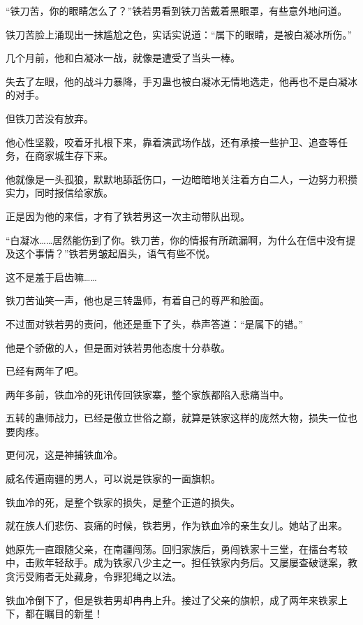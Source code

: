 
\begin{this_body}



“铁刀苦，你的眼睛怎么了？”铁若男看到铁刀苦戴着黑眼罩，有些意外地问道。

铁刀苦脸上涌现出一抹尴尬之色，实话实说道：“属下的眼睛，是被白凝冰所伤。”

几个月前，他和白凝冰一战，就像是遭受了当头一棒。

失去了左眼，他的战斗力暴降，手刃蛊也被白凝冰无情地选走，他再也不是白凝冰的对手。

但铁刀苦没有放弃。

他心性坚毅，咬着牙扎根下来，靠着演武场作战，还有承接一些护卫、追查等任务，在商家城生存下来。

他就像是一头孤狼，默默地舔舐伤口，一边暗暗地关注着方白二人，一边努力积攒实力，同时报信给家族。

正是因为他的来信，才有了铁若男这一次主动带队出现。

“白凝冰……居然能伤到了你。铁刀苦，你的情报有所疏漏啊，为什么在信中没有提及这个事情？”铁若男皱起眉头，语气有些不悦。

这不是羞于启齿嘛……

铁刀苦讪笑一声，他也是三转蛊师，有着自己的尊严和脸面。

不过面对铁若男的责问，他还是垂下了头，恭声答道：“是属下的错。”

他是个骄傲的人，但是面对铁若男他态度十分恭敬。

已经有两年了吧。

两年多前，铁血冷的死讯传回铁家寨，整个家族都陷入悲痛当中。

五转的蛊师战力，已经是傲立世俗之巅，就算是铁家这样的庞然大物，损失一位也要肉疼。

更何况，这是神捕铁血冷。

威名传遍南疆的男人，可以说是铁家的一面旗帜。

铁血冷的死，是整个铁家的损失，是整个正道的损失。

就在族人们悲伤、哀痛的时候，铁若男，作为铁血冷的亲生女儿。她站了出来。

她原先一直跟随父亲，在南疆闯荡。回归家族后，勇闯铁家十三堂，在擂台考较中，击败年轻敌手。成为铁家八少主之一。担任铁家内务后。又屡屡查破谜案，教贪污受贿者无处藏身，令罪犯绳之以法。

铁血冷倒下了，但是铁若男却冉冉上升。接过了父亲的旗帜，成了两年来铁家上下，都在瞩目的新星！


\end{this_body}
